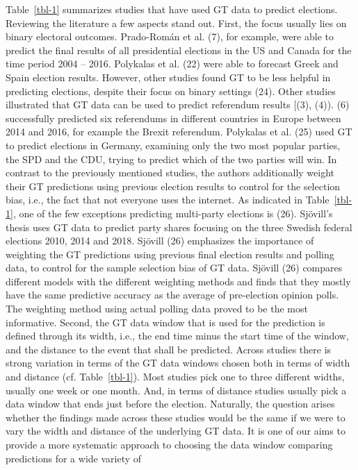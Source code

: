 \documentclass[
  letterpaper,
  DIV=11,
  numbers=noendperiod]{scrartcl}
\begin{document}
Table~\ref{tbl-1} summarizes studies that have used GT data to predict
elections. Reviewing the literature a few aspects stand out. First, the
focus usually lies on binary electoral outcomes. Prado-Román et al. (7),
for example, were able to predict the ﬁnal results of all presidential
elections in the US and Canada for the time period 2004 -- 2016.
Polykalas et al. (22) were able to forecast Greek and Spain election
results. However, other studies found GT to be less helpful in
predicting elections, despite their focus on binary settings (24). Other
studies illustrated that GT data can be used to predict referendum
results {[}(3), (4)). (6) successfully predicted six referendums in
different countries in Europe between 2014 and 2016, for example the
Brexit referendum. Polykalas et al. (25) used GT to predict elections in
Germany, examining only the two most popular parties, the SPD and the
CDU, trying to predict which of the two parties will win. In contrast to
the previously mentioned studies, the authors additionally weight their
GT predictions using previous election results to control for the
selection bias, i.e., the fact that not everyone uses the internet. As
indicated in Table~\ref{tbl-1}, one of the few exceptions predicting
multi-party elections is (26). Sjövill's thesis uses GT data to predict
party shares focusing on the three Swedish federal elections 2010, 2014
and 2018. Sjövill (26) emphasizes the importance of weighting the GT
predictions using previous ﬁnal election results and polling data, to
control for the sample selection bias of GT data. Sjövill (26) compares
diﬀerent models with the diﬀerent weighting methods and finds that they
mostly have the same predictive accuracy as the average of pre-election
opinion polls. The weighting method using actual polling data proved to
be the most informative. Second, the GT data window that is used for the
prediction is defined through its width, i.e., the end time minus the
start time of the window, and the distance to the event that shall be
predicted. Across studies there is strong variation in terms of the GT
data windows chosen both in terms of width and distance (cf.
Table~\ref{tbl-1}). Most studies pick one to three different widths,
usually one week or one month. And, in terms of distance studies usually
pick a data window that ends just before the election. Naturally, the
question arises whether the findings made across these studies would be
the same if we were to vary the width and distance of the underlying GT
data. It is one of our aims to provide a more systematic approach to
choosing the data window comparing predictions for a wide variety of
\end{document}
